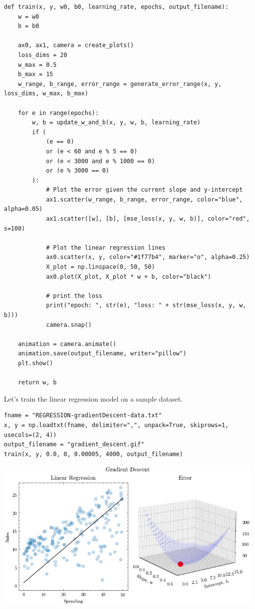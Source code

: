 \documentclass[openany]{book}
\begin{document}
\begin{tcolorbox}
\tiny
\begin{verbatim}
def train(x, y, w0, b0, learning_rate, epochs, output_filename):
    w = w0
    b = b0

    ax0, ax1, camera = create_plots()
    loss_dims = 20
    w_max = 0.5
    b_max = 15
    w_range, b_range, error_range = generate_error_range(x, y, loss_dims, w_max, b_max)

    for e in range(epochs):
        w, b = update_w_and_b(x, y, w, b, learning_rate)
        if (
            (e == 0)
            or (e < 60 and e % 5 == 0)
            or (e < 3000 and e % 1000 == 0)
            or (e % 3000 == 0)
        ):
            # Plot the error given the current slope and y-intercept
            ax1.scatter(w_range, b_range, error_range, color="blue", alpha=0.05)
            ax1.scatter([w], [b], [mse_loss(x, y, w, b)], color="red", s=100)

            # Plot the linear regression lines
            ax0.scatter(x, y, color="#1f77b4", marker="o", alpha=0.25)
            X_plot = np.linspace(0, 50, 50)
            ax0.plot(X_plot, X_plot * w + b, color="black")

            # print the loss
            print("epoch: ", str(e), "loss: " + str(mse_loss(x, y, w, b)))
            camera.snap()

    animation = camera.animate()
    animation.save(output_filename, writer="pillow")
    plt.show()

    return w, b
\end{verbatim}
\end{tcolorbox}
    Let's train the linear regression model on a sample dataset.

\begin{tcolorbox}
\tiny
\begin{verbatim}
fname = "REGRESSION-gradientDescent-data.txt"
x, y = np.loadtxt(fname, delimiter=",", unpack=True, skiprows=1, usecols=(2, 4))
output_filename = "gradient_descent.gif"
train(x, y, 0.0, 0, 0.00005, 4000, output_filename)
\end{verbatim}
\end{tcolorbox}

    \begin{center}
    \includegraphics[width=\textwidth]{combined_files/combined_27_1.png}
    \end{center}
    { \hspace*{\fill} \\}
        
\end{document}
